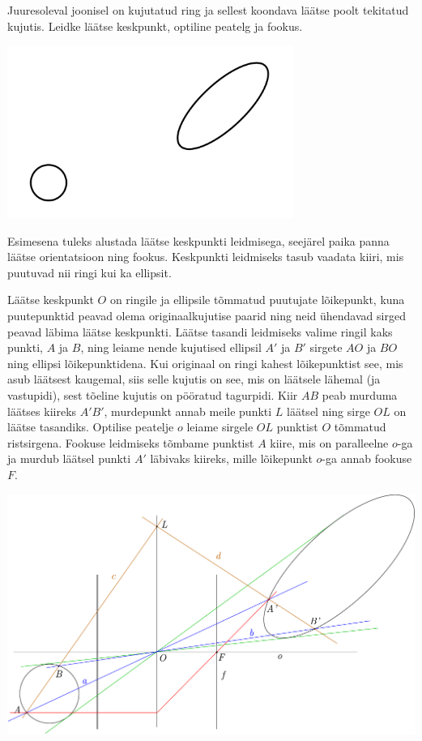 
Juuresoleval joonisel on kujutatud ring ja sellest koondava läätse poolt tekitatud kujutis. Leidke läätse keskpunkt, optiline peatelg ja fookus.
\begin{center}
\includegraphics[width=0.7\textwidth]{2015-v3g-07-ringjaellips}%
\end{center}

\hint
Esimesena tuleks alustada läätse keskpunkti leidmisega, seejärel paika panna läätse orientatsioon ning fookus. Keskpunkti leidmiseks tasub vaadata kiiri, mis puutuvad nii ringi kui ka ellipsit.

\solu
Läätse keskpunkt $O$ on ringile ja ellipsile tõmmatud puutujate lõikepunkt, kuna puutepunktid peavad olema originaalkujutise paarid ning neid ühendavad sirged peavad läbima läätse keskpunkti. Läätse tasandi leidmiseks valime ringil kaks punkti, $A$ ja $B$, ning leiame nende kujutised ellipsil $A'$ ja $B'$ sirgete $AO$ ja $BO$ ning ellipsi lõikepunktidena. Kui originaal on ringi kahest lõikepunktist see, mis asub läätsest kaugemal, siis selle kujutis on see, mis on läätsele lähemal (ja vastupidi), sest tõeline kujutis on pööratud tagurpidi. Kiir $AB$ peab murduma läätses kiireks $A'B'$, murdepunkt annab meile punkti $L$ läätsel ning sirge $OL$ on läätse tasandiks. Optilise peatelje $o$ leiame sirgele $OL$ punktist $O$ tõmmatud ristsirgena. Fookuse leidmiseks tõmbame punktist $A$ kiire, mis on paralleelne $o$-ga ja murdub läätsel punkti $A'$ läbivaks kiireks, mille lõikepunkt $o$-ga annab fookuse $F$.

\begin{center}
\includegraphics[width=\textwidth]{2015-v3g-07-ellips_lah}
\end{center}

